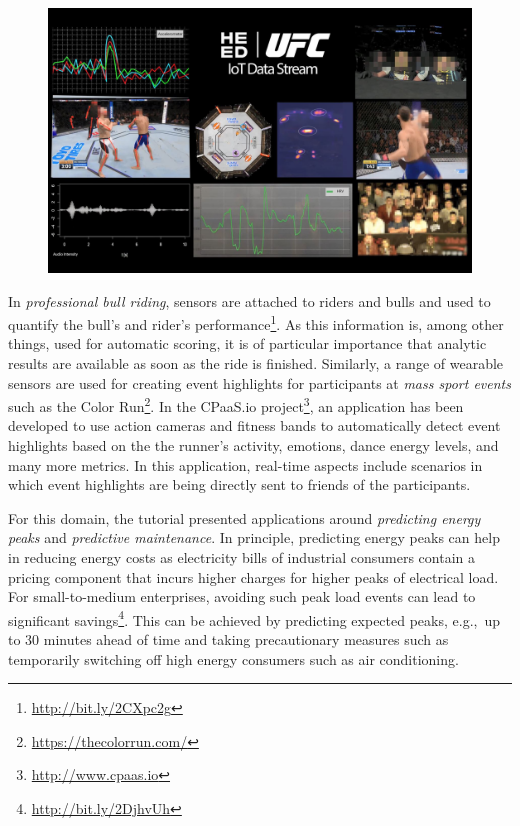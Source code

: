 \begin{figure}[t]
\centering
\includegraphics[scale=0.142]{pictures/DP6L8S9XkAYFMCw.jpg}
\label{FIG:FightStreams}
\end{figure}

In \emph{professional bull riding}, sensors are attached to riders and bulls and used to quantify the bull's and rider's performance\footnote{\url{http://bit.ly/2CXpc2g}}. As this information is, among other things, used for automatic scoring, it is of particular importance that analytic results are available as soon as the ride is finished. Similarly, a range of wearable sensors are used for creating event highlights for participants at \emph{mass sport events} such as the Color Run\footnote{\url{https://thecolorrun.com/}}. In the \textsf{\small CPaaS.io} project\footnote{\url{http://www.cpaas.io}}, an application has been developed to use action cameras and fitness bands to automatically detect event highlights based on the the runner's activity, emotions, dance energy levels, and many more metrics. In this application, real-time aspects include scenarios in which event highlights are being directly sent to friends of the participants.

For this domain, the tutorial presented applications around \emph{predicting energy peaks} and \emph{predictive maintenance}. In principle, predicting energy peaks can help in reducing energy costs as electricity bills of industrial consumers contain a pricing component that incurs higher charges for higher peaks of electrical load. For small-to-medium enterprises, avoiding such peak load events can lead to significant savings\footnote{\url{http://bit.ly/2DjhvUh}}. This can be achieved by predicting expected peaks, e.g.,\ up to 30 minutes ahead of time and taking precautionary measures such as temporarily switching off high energy consumers such as air conditioning.

